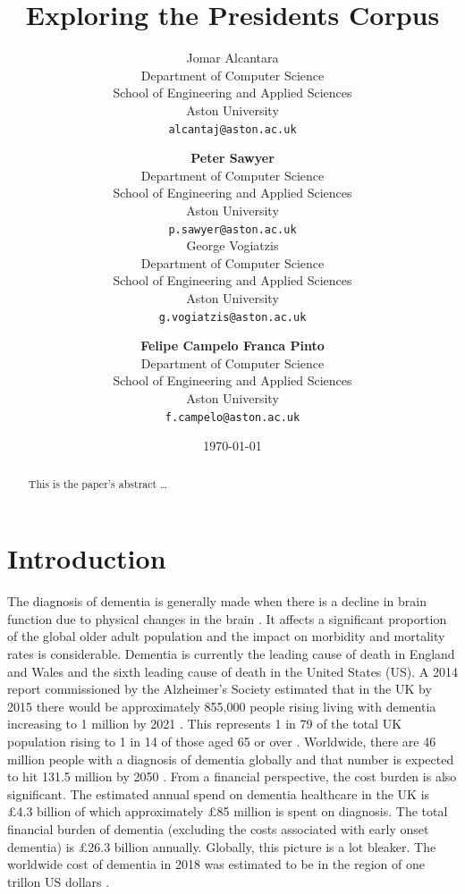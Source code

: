 \documentclass[12pt]{article}
\title{Exploring the Presidents Corpus}
\author{
	Jomar Alcantara \\
	Department of Computer Science\\
	School of Engineering and Applied Sciences\\
	Aston University\\
	\texttt{alcantaj@aston.ac.uk} \\
		\and
	\textbf{Peter Sawyer} \\
	Department of Computer Science\\
	School of Engineering and Applied Sciences\\
	Aston University\\
	\texttt{p.sawyer@aston.ac.uk} \\
		\AND
	George Vogiatzis\\
	Department of Computer Science\\
	School of Engineering and Applied Sciences\\
	Aston University \\
	\texttt{g.vogiatzis@aston.ac.uk} \\
		\and
	\textbf{Felipe Campelo Franca Pinto}\\
	Department of Computer Science\\
	School of Engineering and Applied Sciences\\
	Aston University\\
	\texttt{f.campelo@aston.ac.uk}
}
\date{\today}
\begin{document}
\maketitle

\bigskip
\begin{abstract}
This is the paper's abstract \ldots
\end{abstract}

\section{Introduction}\label{introduction}
The diagnosis of dementia is generally made when there is a decline in brain function due to physical changes in the brain \cite{Albert2011}. It affects a significant proportion of the global older adult population and the impact on morbidity and mortality rates is considerable. Dementia is currently the leading cause of death in England and Wales and the sixth leading cause of death in the United States (US). A 2014 report commissioned by the Alzheimer's Society estimated that in the UK by 2015 there would be approximately 855,000 people rising living with dementia increasing to 1 million by 2021 \cite{}. This represents 1 in 79 of the total UK population rising to 1 in 14 of those aged 65 or over \cite{AlzheimersSociety2014}. Worldwide, there are 46 million people with a diagnosis of dementia globally and that number is expected to hit 131.5 million by 2050 \cite{Prince2015}. From a financial perspective, the cost burden is also significant. The estimated annual spend on dementia healthcare in the UK is £4.3 billion of which approximately £85 million is spent on diagnosis. The total financial burden of dementia (excluding the costs associated with early onset dementia) is £26.3 billion annually. Globally, this picture is a lot bleaker. The worldwide cost of dementia in 2018 was estimated to be in the region of one trillon US dollars \cite{}.
\par 
\end{document}
